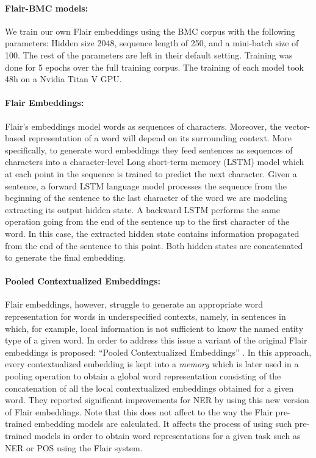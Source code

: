 \documentclass[10pt, a4paper]{article}
\begin{document}
\paragraph{Flair-BMC models:} We train our own Flair embeddings using the BMC corpus with the following parameters: Hidden size 2048, sequence length of 250, and a mini-batch size of 100. The rest of the parameters are left in their default setting. Training was done for 5 epochs over the full training corpus. The training of each model took 48h on a Nvidia Titan V GPU.

\paragraph{Flair Embeddings:} Flair's embeddings model words as sequences of characters. Moreover, the vector-based representation of a word will depend on its surrounding context. More specifically, to generate word embeddings they feed sentences as sequences of characters into a character-level Long short-term memory (LSTM) model which at each point in the sequence is trained to predict the next character. Given a sentence, a forward LSTM language model processes the sequence from the beginning of the sentence to the last character of the word we are modeling extracting its output hidden state. A backward LSTM performs the same operation going from the end of the sentence up to the first character of the word. In this case, the extracted hidden state contains information propagated from the end of the sentence to this point. Both hidden states are concatenated to generate the final embedding.

\paragraph{Pooled Contextualized Embeddings:} Flair embeddings, however, struggle to generate an appropriate word representation for words in underspecified contexts, namely, in sentences in which, for example, local information is not sufficient to know the named entity type of a given word. In order to address this issue a variant of the original Flair embeddings is proposed: ``Pooled Contextualized Embeddings'' \cite{akbik2019naacl}. In this approach, every contextualized embedding is kept into a \emph{memory} which is later used in a pooling operation to obtain a global word representation consisting of the concatenation of all the local contextualized embeddings obtained for a given word. They reported significant improvements for NER by using this new version of Flair embeddings. Note that this does not affect to the way the Flair pre-trained embedding models are calculated. It affects the process of using such pre-trained models in order to obtain word representations for a given task such as NER or POS using the Flair system.
\end{document}
